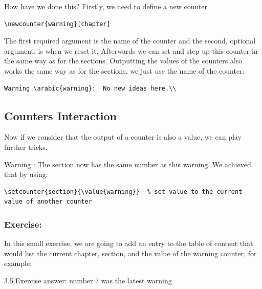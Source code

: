 \documentclass[a4paper,10pt]{report} %
\begin{document}
 How have we done this? Firstly, we need to define a new counter
\begin{lstlisting}[language={[latex]tex}, frame=single,basicstyle=\footnotesize]
  \newcounter{warning}[chapter] 
\end{lstlisting}
The first required argument is the name of the counter and the second, optional argument, is when we reset it.
Afterwards we can set and step up this counter in the same way as for the sections. Outputting the values  of the counters also works the same way as for the sections, we just use the name of the counter:
\begin{lstlisting}[language={[latex]tex}, frame=single,basicstyle=\footnotesize]
  Warning \arabic{warning}:  No new ideas here.\\
\end{lstlisting}

\setcounter{section}{\value{warning}}

\subsection{Counters Interaction}
Now if we consider that the output of a counter is also a value, we can play further tricks. 

Warning :  The section now has the same number as this warning. We achieved that by using:\\

\begin{lstlisting}[language={[latex]tex}, frame=single,basicstyle=\footnotesize]
\setcounter{section}{\value{warning}}  % set value to the current  value of another counter 
\end{lstlisting}

\subsubsection{Exercise:}
In this small exercise, we are going to add an entry to the table of content that would list the current chapter, section, and the value of the warning counter, for example:\\

\begin{center}
 3.5.Exercise answer: number 7 was the latest warning 
\end{center}

\end{document}
